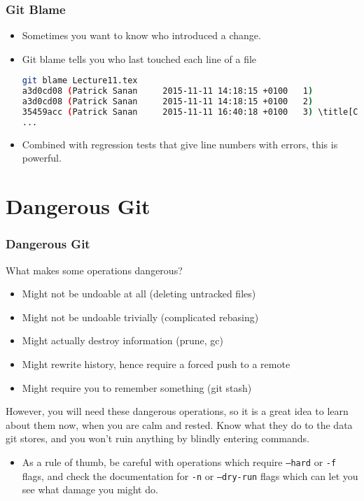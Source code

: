 \documentclass{beamer}
\begin{document}
\begin{frame}[fragile]
\frametitle{Git Blame}
\begin{itemize}
\item Sometimes you want to know who introduced a change.
\item Git blame tells you who last touched each line of a file
\begin{lstlisting}[language=bash,
basicstyle=\tiny\ttfamily]
git blame Lecture11.tex
a3d0cd08 (Patrick Sanan     2015-11-11 14:18:15 +0100   1) 
a3d0cd08 (Patrick Sanan     2015-11-11 14:18:15 +0100   2)
35459acc (Patrick Sanan     2015-11-11 16:40:18 +0100   3) \title[CEFCS Week 11]{Software Engineering for Computational Science: Week 11}
...
\end{lstlisting}
\item Combined with regression tests that give line numbers with errors, this is powerful.
\end{itemize}
\end{frame}

\section{Dangerous Git}

\begin{frame}[fragile]
\frametitle{Dangerous Git}
What makes some operations dangerous?
\begin{itemize}
\item Might not be undoable at all (deleting untracked files)
\item Might not be undoable trivially (complicated rebasing)
\item Might actually destroy information (prune, gc)
\item Might rewrite history, hence require a forced push to a remote
\item Might require you to remember something (git stash)
\end{itemize}
However, you will need these dangerous operations, so it is a great idea to learn about them now, when you are calm and rested. Know what they do to the data git stores, and you won't ruin anything by blindly entering commands.
\begin{itemize}
\item As a rule of thumb, be careful with operations which require \texttt{--hard} or \texttt{-f} flags, and check the documentation for \texttt{-n} or \texttt{--dry-run} flags which can let you see what damage you might do.
\end{itemize}
\end{frame}
\end{document}

